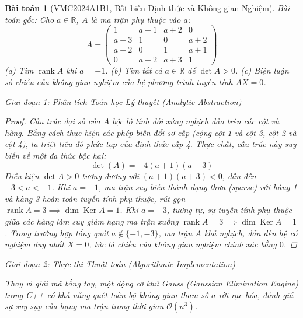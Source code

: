 \documentclass{article}
\newtheorem{baitoan}{Bài toán}
\begin{document}
\begin{baitoan}[VMC2024A1B1, Bất biến Định thức và Không gian Nghiệm]
 \emph{Bài toán gốc:} 
 Cho $a\in\mathbb{R}$, $A$ là ma trận phụ thuộc vào $a$:
 \begin{equation}
 A = \begin{pmatrix}
 1 & a + 1 & a + 2 & 0\\a + 3 & 1 & 0 & a + 2\\a + 2 & 0 & 1 & a + 1\\0 & a + 2 & a + 3 & 1
 \end{pmatrix}
 \end{equation}
 (a) Tìm $\operatorname{rank}A$ khi $a = -1$. (b) Tìm tất cả $a\in\mathbb{R}$ để $\det A > 0$. (c) Biện luận số chiều của không gian nghiệm của hệ phương trình tuyến tính $AX = 0$.

\vspace{0.5em}\noindent\emph{Giai đoạn 1: Phân tích Toán học Lý thuyết (Analytic Abstraction)}
 
\begin{proof}
 Cấu trúc đại số của $A$ bộc lộ tính đối xứng nghịch đảo trên các cột và hàng. Bằng cách thực hiện các phép biến đổi sơ cấp (cộng cột 1 và cột 3, cột 2 và cột 4), ta triệt tiêu độ phức tạp của định thức cấp 4. Thực chất, cấu trúc này suy biến về một đa thức bậc hai:
 \begin{equation}
 \det(A) = -4(a+1)(a+3)
 \end{equation}
 Điều kiện $\det A > 0$ tương đương với $(a+1)(a+3) < 0$, dẫn đến $-3 < a < -1$.
 Khi $a = -1$, ma trận suy biến thành dạng thưa (sparse) với hàng 1 và hàng 3 hoàn toàn tuyến tính phụ thuộc, rút gọn $\operatorname{rank}A = 3 \implies \dim \operatorname{Ker}A = 1$. Khi $a = -3$, tương tự, sự tuyến tính phụ thuộc giữa các hàng làm suy giảm hạng ma trận xuống $\operatorname{rank}A = 3 \implies \dim \operatorname{Ker}A = 1$. Trong trường hợp tổng quát $a \notin \{-1, -3\}$, ma trận $A$ khả nghịch, dẫn đến hệ có nghiệm duy nhất $X=0$, tức là chiều của không gian nghiệm chính xác bằng $0$.
 \end{proof}

\vspace{0.5em}\noindent\emph{Giai đoạn 2: Thực thi Thuật toán (Algorithmic Implementation)}
 
 Thay vì giải mã bằng tay, một động cơ khử Gauss (Gaussian Elimination Engine) trong C++ có khả năng quét toàn bộ không gian tham số $a$ rời rạc hóa, đánh giá sự suy sụp của hạng ma trận trong thời gian $\mathcal{O}(n^3)$.


\end{baitoan}
\end{document}
